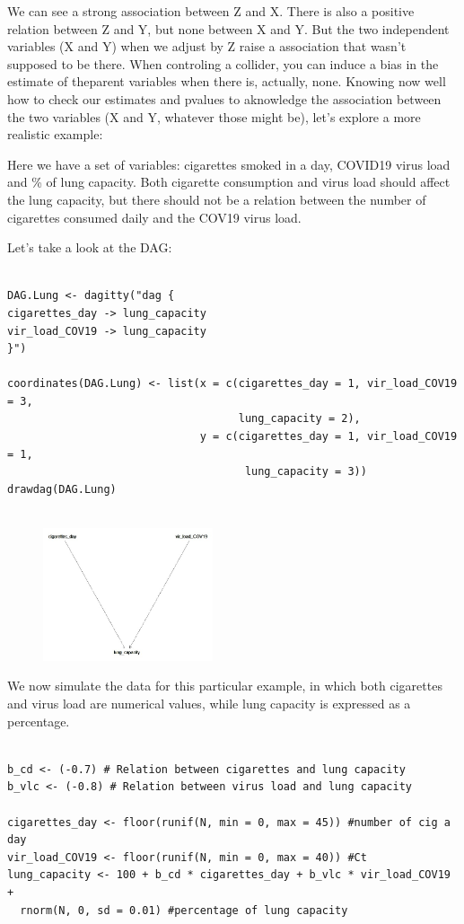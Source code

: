 \documentclass{article}
\begin{document}
We can see a strong association between Z and X. There is also a positive relation between Z and Y, but none between X and Y. But the two independent  variables (X and Y) when we adjust by Z raise a association that wasn't supposed to be there.
When controling a collider, you can induce a bias in the estimate of theparent variables when there is, actually, none.
Knowing now well how to check our estimates and pvalues to aknowledge the association between the two variables (X and Y, whatever those might be), let's explore a more realistic example:

Here we have a set of variables: cigarettes smoked in a day, COVID19 virus load and \% of lung capacity. Both cigarette consumption and virus load should affect the lung capacity, but there should not be a relation between the number of cigarettes consumed daily and the COV19 virus load.

Let's take a look at the DAG:

\begin{lstlisting}

DAG.Lung <- dagitty("dag {
cigarettes_day -> lung_capacity
vir_load_COV19 -> lung_capacity
}")

coordinates(DAG.Lung) <- list(x = c(cigarettes_day = 1, vir_load_COV19 = 3, 
                                    lung_capacity = 2),
                              y = c(cigarettes_day = 1, vir_load_COV19 = 1,
                                     lung_capacity = 3))
drawdag(DAG.Lung)


\end{lstlisting}


\begin{figure}[h]
\includegraphics[width=5cm]{DAG_CIG_LUNG.png}
\centering
\end{figure}


We now simulate the data for this particular example, in which both cigarettes and virus load are numerical values, while lung capacity is expressed as a percentage.


\begin{lstlisting}

b_cd <- (-0.7) # Relation between cigarettes and lung capacity
b_vlc <- (-0.8) # Relation between virus load and lung capacity 

cigarettes_day <- floor(runif(N, min = 0, max = 45)) #number of cig a day
vir_load_COV19 <- floor(runif(N, min = 0, max = 40)) #Ct
lung_capacity <- 100 + b_cd * cigarettes_day + b_vlc * vir_load_COV19 + 
  rnorm(N, 0, sd = 0.01) #percentage of lung capacity

\end{lstlisting}
\end{document}
